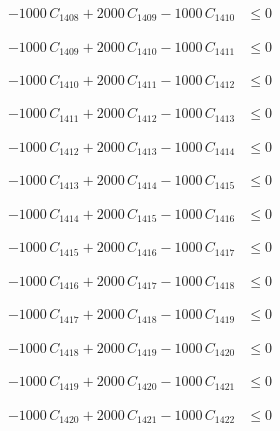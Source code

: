 \documentclass[a4paper,11pt]{article}
\begin{document}
\begin{align}
-1000\,C_{1408} + 2000\,C_{1409} - 1000\,C_{1410} &\leq 0 \nonumber
\end{align}

\begin{align}
-1000\,C_{1409} + 2000\,C_{1410} - 1000\,C_{1411} &\leq 0 \nonumber
\end{align}

\begin{align}
-1000\,C_{1410} + 2000\,C_{1411} - 1000\,C_{1412} &\leq 0 \nonumber
\end{align}

\begin{align}
-1000\,C_{1411} + 2000\,C_{1412} - 1000\,C_{1413} &\leq 0 \nonumber
\end{align}

\begin{align}
-1000\,C_{1412} + 2000\,C_{1413} - 1000\,C_{1414} &\leq 0 \nonumber
\end{align}

\begin{align}
-1000\,C_{1413} + 2000\,C_{1414} - 1000\,C_{1415} &\leq 0 \nonumber
\end{align}

\begin{align}
-1000\,C_{1414} + 2000\,C_{1415} - 1000\,C_{1416} &\leq 0 \nonumber
\end{align}

\begin{align}
-1000\,C_{1415} + 2000\,C_{1416} - 1000\,C_{1417} &\leq 0 \nonumber
\end{align}

\begin{align}
-1000\,C_{1416} + 2000\,C_{1417} - 1000\,C_{1418} &\leq 0 \nonumber
\end{align}

\begin{align}
-1000\,C_{1417} + 2000\,C_{1418} - 1000\,C_{1419} &\leq 0 \nonumber
\end{align}

\begin{align}
-1000\,C_{1418} + 2000\,C_{1419} - 1000\,C_{1420} &\leq 0 \nonumber
\end{align}

\begin{align}
-1000\,C_{1419} + 2000\,C_{1420} - 1000\,C_{1421} &\leq 0 \nonumber
\end{align}

\begin{align}
-1000\,C_{1420} + 2000\,C_{1421} - 1000\,C_{1422} &\leq 0 \nonumber
\end{align}
\end{document}

